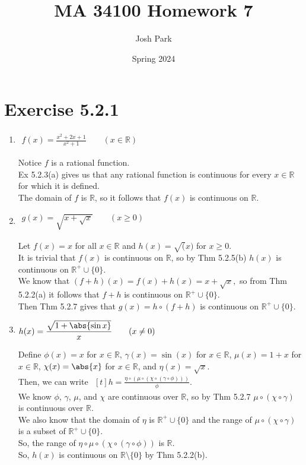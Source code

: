 \documentclass[11pt]{article}
\author{Josh Park}
\date{\vspace{-1em}Spring 2024\vspace{-1em}}
\title{MA 34100 Homework 7\vspace{-1em}}
\newcommand{\R}{\mathbb{R}}  %
\begin{document}
\maketitle
\section*{Exercise 5.2.1}
\begin{enumerate}[label=(\alph*)]
    \item $\begin{aligned} f(x)=\frac{x^2+2x+1}{x^2+1} \qquad (x\in\R)\end{aligned}$

    Notice $f$ is a rational function. \\
    Ex 5.2.3(a) gives us that any rational function is continuous for every $x\in\R$ for which it is defined. \\
    The domain of $f$ is $\R$, so it follows that $f(x)$ is continuous on $\R$.

    \item $\begin{aligned} g(x)=\sqrt{x+\sqrt{x}} \qquad (x\geq 0) \end{aligned}$

    Let $f(x)=x$ for all $x\in\R$ and $h(x)=\sqrt(x)$ for $x\geq 0$.\\
    It is trivial that $f(x)$ is continuous on $\R$, so by Thm 5.2.5(b) $h(x)$ is continuous on $\R^+\cup\{0\}$. \\
    We know that $(f+h)(x)=f(x)+h(x)=x+\sqrt{x},$ so from Thm 5.2.2(a) it follows that $f+h$ is continuous on $\R^+\cup\{0\}$. \\
    Then Thm 5.2.7 gives that $g(x)=h\circ(f+h)$ is continuous on $\R^+\cup\{0\}$. \\

    \item $\begin{aligned} h(x)=\frac{\sqrt{1+\abs{\sin x}}}{x} \qquad (x\neq 0)\end{aligned}$

    Define $\phi(x)=x$ for $x\in\R$, $\gamma(x)=\sin(x)$ for $x\in\R$, $\mu(x)=1+x$ for $x\in\R$, $\chi(x)=\abs{x}$ for $x\in\R$, and $\eta(x)=\sqrt{x}$. \\
    Then, we can write
    $\begin{aligned}[t] h=\frac{\eta\circ(\mu\circ(\chi\circ(\gamma\circ\phi)))}{\phi}. \end{aligned}$ \\
    We know $\phi$, $\gamma$, $\mu$, and $\chi$ are continuous over $\R$, so by Thm 5.2.7 $\mu\circ(\chi\circ\gamma)$ is continuous over $\R$. \\
    We also know that the domain of $\eta$ is $\R^+\cup\{0\}$ and the range of $\mu\circ(\chi\circ\gamma)$ is a subset of $\R^+\cup\{0\}$. \\
    So, the range of $\eta\circ\mu\circ(\chi\circ(\gamma\circ\phi))$ is $\R$. \\
    So, $h(x)$ is continuous on $\R\setminus \{0\}$ by Thm 5.2.2(b).


\end{enumerate}
\end{document}
